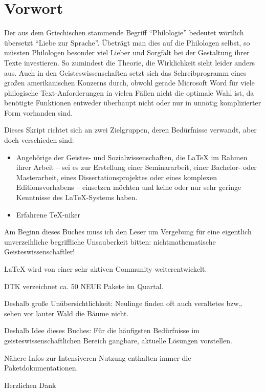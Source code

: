 \chapter{Vorwort}

Der aus dem Griechischen stammende Begriff \enquote{Philologie} bedeutet wörtlich übersetzt \enquote{Liebe zur Sprache}. Übeträgt man dies auf die Philologen selbst, so müssten Philologen besonder viel Lieber und Sorgfalt bei der Gestaltung ihrer Texte investieren. So zumindest die Theorie, die Wirklichkeit sieht leider anders aus. Auch in den Geisteswissenschaften setzt sich das Schreibprogramm eines großen amerikanischen Konzerns durch, obwohl gerade Microsoft Word für viele philogische Text-Anforderungen in vielen Fällen nicht die optimale Wahl ist, da benötigte Funktionen entweder überhaupt nicht oder nur in unnötig komplizierter Form vorhanden sind. 

Dieses Skript richtet sich an zwei Zielgruppen, deren Bedürfnisse verwandt, aber doch verschieden sind:

\begin{itemize}
 \item Angehörige der Geistes- und Sozialwissenschaften, die \LaTeX{} im Rahmen ihrer Arbeit
 -- sei es zur Erstellung einer Seminararbeit, einer Bachelor- oder Masterarbeit, eines
 Dissertationsprojektes oder eines komplexen Editionsvorhabens --
 einsetzen möchten und keine oder nur sehr geringe Kenntnisse des \LaTeX{}-Systems haben.
 \item Erfahrene \TeX-niker
\end{itemize}

Am Beginn dieses Buches muss ich den Leser um Vergebung für eine eigentlich unverzeihliche begriffliche
Unsauberkeit bitten: nichtmathematische Geisteswissenschaftler!

\LaTeX{} wird von einer sehr aktiven Community weiterentwickelt.

DTK verzeichnet ca. 50 NEUE Pakete im Quartal.

Deshalb große Unübersichtlichkeit: Neulinge finden oft auch veraltetes bzw,. sehen vor lauter
Wald die Bäume nicht.

Deshalb Idee dieses Buches: Für die häufigsten Bedürfnisse im geisteswissenschaftlichen
Bereich gangbare, aktuelle Lösungen vorstellen.

Nähere Infos zur Intensiveren Nutzung enthalten immer die Paketdokumentationen.

Herzlichen Dank 
\endinput